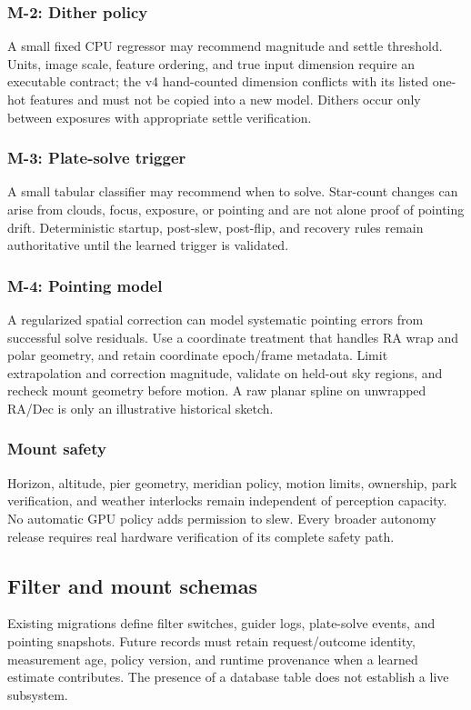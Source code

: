 \documentclass[11pt,a4paper]{article}
\begin{document}
\subsubsection{M-2: Dither policy}
A small fixed CPU regressor may recommend magnitude and settle threshold.
Units, image scale, feature ordering, and true input dimension require an
executable contract; the v4 hand-counted dimension conflicts with its listed
one-hot features and must not be copied into a new model. Dithers occur only
between exposures with appropriate settle verification.

\subsubsection{M-3: Plate-solve trigger}
A small tabular classifier may recommend when to solve. Star-count changes
can arise from clouds, focus, exposure, or pointing and are not alone proof of
pointing drift. Deterministic startup, post-slew, post-flip, and recovery rules
remain authoritative until the learned trigger is validated.

\subsubsection{M-4: Pointing model}
A regularized spatial correction can model systematic pointing errors from
successful solve residuals. Use a coordinate treatment that handles RA wrap
and polar geometry, and retain coordinate epoch/frame metadata. Limit
extrapolation and correction magnitude, validate on held-out sky regions, and
recheck mount geometry before motion. A raw planar spline on unwrapped RA/Dec
is only an illustrative historical sketch.

\subsubsection{Mount safety}
Horizon, altitude, pier geometry, meridian policy, motion limits, ownership,
park verification, and weather interlocks remain independent of perception
capacity. No automatic GPU policy adds permission to slew. Every broader
autonomy release requires real hardware verification of its complete safety path.

\subsection{Filter and mount schemas}
Existing migrations define filter switches, guider logs, plate-solve events,
and pointing snapshots. Future records must retain request/outcome identity,
measurement age, policy version, and runtime provenance when a learned estimate
contributes. The presence of a database table does not establish a live subsystem.
\end{document}
